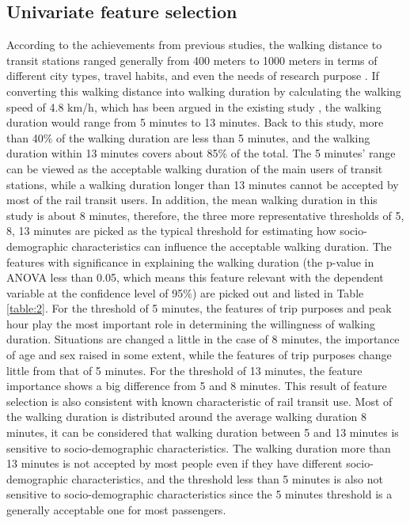 \documentclass[Journal,letterpaper]{ascelike-new}
\begin{document}
\subsection{Univariate feature selection}
According to the achievements from previous studies, the walking distance to transit stations ranged generally from 400 meters to 1000 meters in terms of different city types, travel habits, and even the needs of research purpose \cite{Guerra2012,Murray1998,OSullivan1996,Keijer2000,Zhao2003,Alshalalfah2007}. If converting this walking distance into walking duration by calculating the walking speed of 4.8 km/h, which has been argued in the existing study \cite{Bohannon1997}, the walking duration would range from 5 minutes to 13 minutes. Back to this study, more than 40\% of the walking duration are less than 5 minutes, and the walking duration within 13 minutes covers about 85\% of the total. The 5 minutes’ range can be viewed as the acceptable walking duration of the main users of transit stations, while a walking duration longer than 13 minutes cannot be accepted by most of the rail transit users. In addition, the mean walking duration in this study is about 8 minutes, therefore, the three more representative thresholds of 5, 8, 13 minutes are picked as the typical threshold for estimating how socio-demographic characteristics can influence the acceptable walking duration. The features with significance in explaining the walking duration (the p-value in ANOVA less than 0.05, which means this feature relevant with the dependent variable at the confidence level of 95\%) are picked out and listed in Table \ref{table:2}.
%
For the threshold of 5 minutes, the features of trip purposes and peak hour play the most important role in determining the willingness of walking duration. Situations are changed a little in the case of 8 minutes, the importance of age and sex raised in some extent, while the features of trip purposes change little from that of 5 minutes. For the threshold of 13 minutes, the feature importance shows a big difference from 5 and 8 minutes. This result of feature selection is also consistent with known characteristic of rail transit use. Most of the walking duration is distributed around the average walking duration 8 minutes, it can be considered that walking duration between 5 and 13 minutes is sensitive to socio-demographic characteristics. The walking duration more than 13 minutes is not accepted by most people even if they have different socio-demographic characteristics, and the threshold less than 5 minutes is also not sensitive to socio-demographic characteristics since the 5 minutes threshold is a generally acceptable one for most passengers.
%
\end{document}
